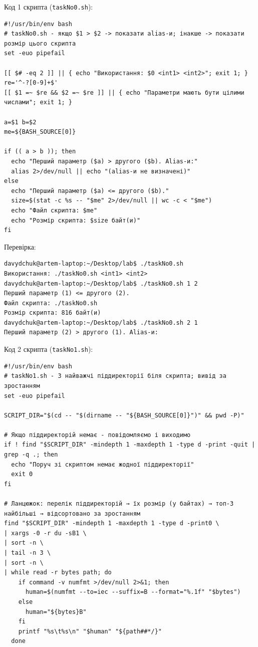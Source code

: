 \documentclass[12pt,a4paper]{article}
\begin{document}
    \newpage

    Код 1 скрипта (\texttt{taskNo0.sh}):

    \begin{verbatim}
#!/usr/bin/env bash
# taskNo0.sh - якщо $1 > $2 -> показати alias-и; інакше -> показати розмір цього скрипта
set -euo pipefail

[[ $# -eq 2 ]] || { echo "Використання: $0 <int1> <int2>"; exit 1; }
re='^-?[0-9]+$'
[[ $1 =~ $re && $2 =~ $re ]] || { echo "Параметри мають бути цілими числами"; exit 1; }

a=$1 b=$2
me=${BASH_SOURCE[0]}

if (( a > b )); then
  echo "Перший параметр ($a) > другого ($b). Alias-и:"
  alias 2>/dev/null || echo "(alias-и не визначені)"
else
  echo "Перший параметр ($a) <= другого ($b)."
  size=$(stat -c %s -- "$me" 2>/dev/null || wc -c < "$me")
  echo "Файл скрипта: $me"
  echo "Розмір скрипта: $size байт(и)"
fi
    \end{verbatim}

    Перевірка:
    \begin{verbatim}
davydchuk@artem-laptop:~/Desktop/lab$ ./taskNo0.sh
Використання: ./taskNo0.sh <int1> <int2>
davydchuk@artem-laptop:~/Desktop/lab$ ./taskNo0.sh 1 2
Перший параметр (1) <= другого (2).
Файл скрипта: ./taskNo0.sh
Розмір скрипта: 816 байт(и)
davydchuk@artem-laptop:~/Desktop/lab$ ./taskNo0.sh 2 1
Перший параметр (2) > другого (1). Alias-и:
    \end{verbatim}

    Код 2 скрипта (\texttt{taskNo1.sh}):

    \begin{verbatim}
#!/usr/bin/env bash
# taskNo1.sh - 3 найважчі піддиректорії біля скрипта; вивід за зростанням
set -euo pipefail

SCRIPT_DIR="$(cd -- "$(dirname -- "${BASH_SOURCE[0]}")" && pwd -P)"

# Якщо піддиректорій немає - повідомляємо і виходимо
if ! find "$SCRIPT_DIR" -mindepth 1 -maxdepth 1 -type d -print -quit | grep -q .; then
  echo "Поруч зі скриптом немає жодної піддиректорії"
  exit 0
fi

# Ланцюжок: перелік піддиректорій → їх розмір (у байтах) → топ-3 найбільші → відсортовано за зростанням
find "$SCRIPT_DIR" -mindepth 1 -maxdepth 1 -type d -print0 \
| xargs -0 -r du -sB1 \
| sort -n \
| tail -n 3 \
| sort -n \
| while read -r bytes path; do
    if command -v numfmt >/dev/null 2>&1; then
      human=$(numfmt --to=iec --suffix=B --format="%.1f" "$bytes")
    else
      human="${bytes}B"
    fi
    printf "%s\t%s\n" "$human" "${path##*/}"
  done
    \end{verbatim}
\end{document}
